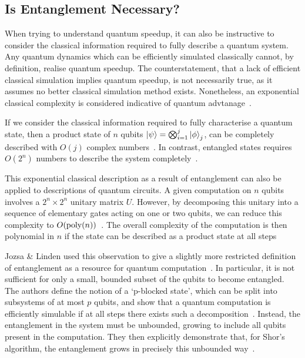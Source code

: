 \documentclass{standalone}
\begin{document}
\subsection{Is Entanglement Necessary?}\label{sec:classicalsim}
When trying to understand quantum speedup, it can also be instructive to consider the classical information required to fully describe a quantum system. Any quantum dynamics which can be efficiently simulated classically cannot, by definition, realise quantum speedup. The counterstatement, that a lack of efficient classical simulation implies quantum speedup, is not necessarily true, as it assumes no better classical simulation method exists. Nonetheless, an exponential classical complexity is considered indicative of quantum advtanage~\cite{Jozsa2003}.
\par
If we consider the classical information required to fully characterise a quantum state, then a product state of $n$ qubits $\ket{\psi}=\bigotimes_{i=1}^{j}\ket{\phi}_{j}$, can be completely described with $O(j)$ complex numbers~\cite{Jozsa1997}. In contrast, entangled states requires $O(2^{n})$ numbers to describe the system completely~\cite{Jozsa1997}. 
\par
This exponential classical description as a result of entanglement can also be applied to descriptions of quantum circuits. A given computation on $n$ qubits involves a $2^{n}\times2^{n}$ unitary matrix $U$. However, by decomposing this unitary into a sequence of elementary gates acting on one or two qubits, we can reduce this complexity to $O(\text{poly}(n))$~\cite{Ekert1998}. The overall complexity of the computation is then polynomial in $n$ if the state can be described as a product state at all steps~\cite{Ekert1998} 
\par
Jozsa \& Linden used this observation to give a slightly more restricted definition of entanglement as a resource for quantum computation~\cite{Jozsa2003}. In particular, it is not sufficient for only a small, bounded subset of the qubits to become entangled. The authors define the notion of a `p-blocked state', which can be split into subsystems of at most $p$ qubits, and show that a quantum computation is efficiently simulable if at all steps there exists such a decomposition~\cite{Jozsa2003}. Instead, the entanglement in the system must be unbounded, growing to include all qubits present in the computation. They then explicitly demonstrate that, for Shor's algorithm, the entanglement grows in precisely this unbounded way~\cite{Jozsa2003}.
\end{document}
